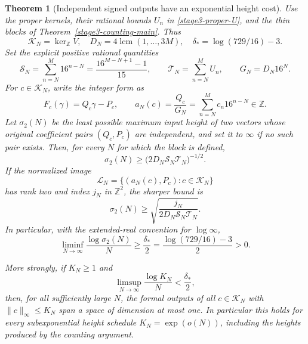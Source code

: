 \documentclass[11pt,a4paper]{article}
\newtheorem{theorem}{Theorem}[section]
\theoremstyle{definition}
\theoremstyle{remark}
\begin{document}
\begin{theorem}[Independent signed outputs have an exponential height cost]
\label{unified-signed-actual-barrier}
Use the proper kernels, their rational bounds $U_n$ in
\eqref{stage3-proper-U}, and the thin blocks of
Theorem~\ref{stage3-counting-main}.  Thus
\[
 \mathcal K_N=\ker_{\mathbb Z}V,
 \quad D_N=4\operatorname{lcm}(1,\ldots,3M),
 \quad \delta_*=\log(729/16)-3.
\]
Set the explicit positive rational quantities
\[
 \mathcal S_N=\sum_{n=N}^M16^{n-N}
     =\frac{16^{M-N+1}-1}{15},
 \qquad
 \mathcal T_N=\sum_{n=N}^M U_n,
 \qquad G_N=D_N16^N.
\]
For $c\in\mathcal K_N$, write the integer form as
\[
 F_c(\gamma)=Q_c\gamma-P_c,
 \qquad
 a_N(c)=\frac{Q_c}{G_N}
       =\sum_{n=N}^M c_n16^{n-N}\in\mathbb Z.
\]
Let $\sigma_2(N)$ be the least possible maximum input height of
two vectors whose original coefficient pairs $(Q_c,P_c)$ are
independent, and set it to $\infty$ if no such pair exists.
Then, for every $N$ for which the block is defined,
\begin{equation}\label{unified-signed-actual-finite}
 \sigma_2(N)\ge
 \bigl(2D_N\mathcal S_N\mathcal T_N\bigr)^{-1/2}.
\end{equation}
If the normalized image
\[
 \mathcal L_N
   =\{(a_N(c),P_c):c\in\mathcal K_N\}
\]
has rank two and index $j_N$ in $\mathbb Z^2$, the sharper bound is
\begin{equation}\label{unified-signed-actual-index}
 \sigma_2(N)\ge
 \sqrt{\frac{j_N}{2D_N\mathcal S_N\mathcal T_N}}.
\end{equation}
In particular, with the extended-real convention for $\log\infty$,
\begin{equation}\label{unified-signed-actual-rate}
 \liminf_{N\to\infty}\frac{\log\sigma_2(N)}N
 \ge\frac{\delta_*}{2}
 =\frac{\log(729/16)-3}{2}>0.
\end{equation}

More strongly, if $K_N\ge1$ and
\[
 \limsup_{N\to\infty}\frac{\log K_N}{N}
 <\frac{\delta_*}{2},
\]
then, for all sufficiently large $N$, the formal outputs of
\emph{all} $c\in\mathcal K_N$ with $\|c\|_\infty\le K_N$
span a space of dimension at most one.  In particular this holds
for every subexponential height schedule $K_N=\exp(o(N))$,
including the heights produced by the counting argument.
\end{theorem}
\end{document}
